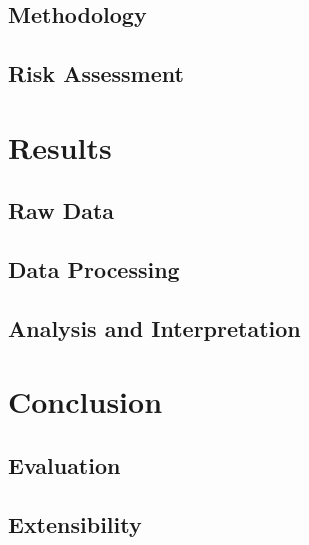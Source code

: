 \documentclass[a4paper,12pt]{article}
\begin{document}
\subsection{Methodology}

\subsection{Risk Assessment}

\section{Results}

\subsection{Raw Data}

\subsection{Data Processing}

\subsection{Analysis and Interpretation}

\section{Conclusion}

\subsection{Evaluation}

\subsection{Extensibility}

\pagebreak

\printbibliography
\end{document}
